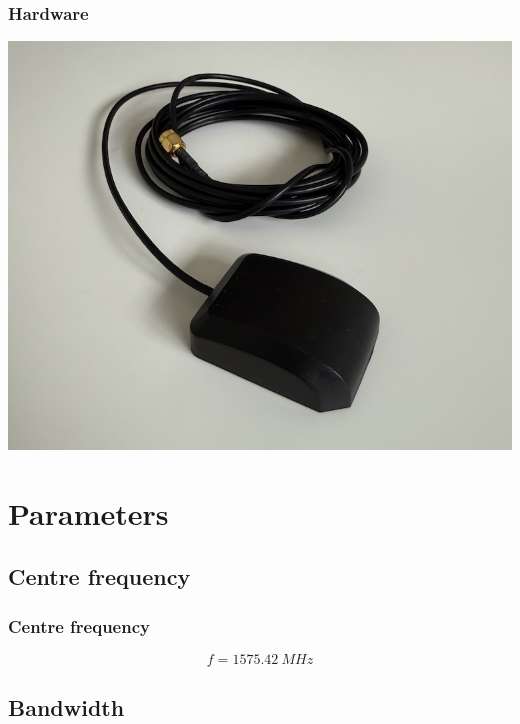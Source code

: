 \documentclass[aspectratio=169]{beamer}
\begin{document}
\begin{frame}
    \frametitle{Hardware}

    \centering
    \includegraphics[width=\textwidth / 2]{2 GPS antenna.jpg}
\end{frame}

\section{Parameters}

\subsection{Centre frequency}

\begin{frame}
    \frametitle{Centre frequency}

    \Large
    \[f = \qty{1575.42}{MHz}\]
\end{frame}

\subsection{Bandwidth}
\end{document}
